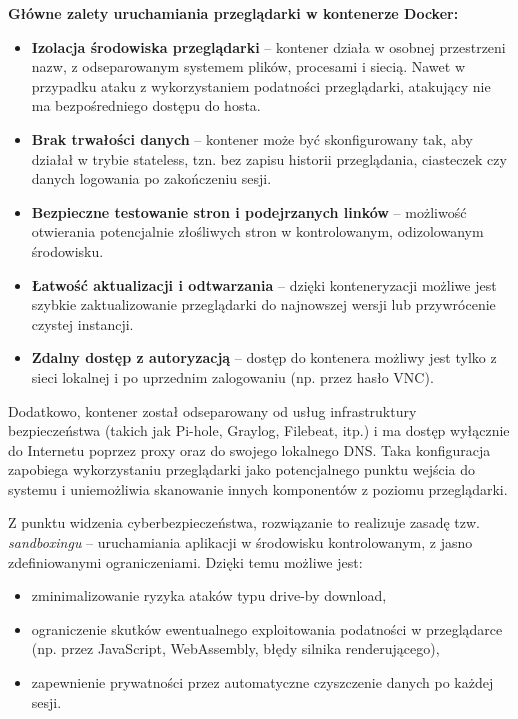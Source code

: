 \documentclass[
    left=2.5cm,         %
    right=2.5cm,        %
    top=2.5cm,          %
    bottom=3cm,         %
    bindingoffset=6mm,  %
    nohyphenation=true %
]{eiti/eiti-thesis} %
\begin{document}
\textbf{Główne zalety uruchamiania przeglądarki w kontenerze Docker:}
\begin{itemize}
    \item \textbf{Izolacja środowiska przeglądarki} – kontener działa w osobnej przestrzeni nazw, z odseparowanym systemem plików, procesami i siecią. Nawet w przypadku ataku z wykorzystaniem podatności przeglądarki, atakujący nie ma bezpośredniego dostępu do hosta.
    \item \textbf{Brak trwałości danych} – kontener może być skonfigurowany tak, aby działał w trybie stateless, tzn. bez zapisu historii przeglądania, ciasteczek czy danych logowania po zakończeniu sesji.
    \item \textbf{Bezpieczne testowanie stron i podejrzanych linków} – możliwość otwierania potencjalnie złośliwych stron w kontrolowanym, odizolowanym środowisku.
    \item \textbf{Łatwość aktualizacji i odtwarzania} – dzięki konteneryzacji możliwe jest szybkie zaktualizowanie przeglądarki do najnowszej wersji lub przywrócenie czystej instancji.
    \item \textbf{Zdalny dostęp z autoryzacją} – dostęp do kontenera możliwy jest tylko z sieci lokalnej i po uprzednim zalogowaniu (np. przez hasło VNC).
\end{itemize}

Dodatkowo, kontener został odseparowany od usług infrastruktury bezpieczeństwa (takich jak Pi-hole, Graylog, Filebeat, itp.) i ma dostęp wyłącznie do Internetu poprzez proxy oraz do swojego lokalnego DNS. Taka konfiguracja zapobiega wykorzystaniu przeglądarki jako potencjalnego punktu wejścia do systemu i uniemożliwia skanowanie innych komponentów z poziomu przeglądarki.

Z punktu widzenia cyberbezpieczeństwa, rozwiązanie to realizuje zasadę tzw. \textit{sandboxingu} – uruchamiania aplikacji w środowisku kontrolowanym, z jasno zdefiniowanymi ograniczeniami. Dzięki temu możliwe jest:
\begin{itemize}
    \item zminimalizowanie ryzyka ataków typu drive-by download,
    \item ograniczenie skutków ewentualnego exploitowania podatności w przeglądarce (np. przez JavaScript, WebAssembly, błędy silnika renderującego),
    \item zapewnienie prywatności przez automatyczne czyszczenie danych po każdej sesji.
\end{itemize}
\end{document}
